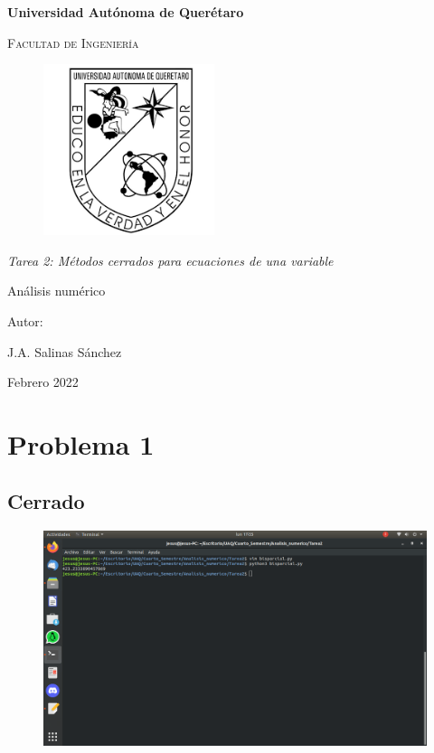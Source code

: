 \documentclass[12pt,oneside,FLEQN]{report}
\begin{document}
{
\selectfont
\begin{titlepage}
        \topmargin=0cm
        \centering

        {\bfseries\LARGE Universidad Autónoma de Querétaro \par}
        \vspace{1cm}
        {\scshape\Large  Facultad de Ingenier\'ia  \par}
        \vspace{2cm}
        \centering
        \begin{figure}[!h]
        \centering
                \includegraphics[height=5cm]{Logouaq.png}
        \end{figure}
        \vspace{3cm}
        {\itshape\large Tarea 2: Métodos cerrados para ecuaciones de una variable\par}
        \vspace{3cm}
        {\Huge Análisis numérico \par}
        \vspace{2cm}
        {\Large Autor: \par}
        {\large J.A. Salinas Sánchez \par}
        {\large Febrero 2022 \par}
\end{titlepage}
\tableofcontents
\section{Problema 1}
	\subsection{Cerrado}
	
	\begin{figure}[!h]
		\centering
		\includegraphics[scale=0.3]{12.png}
	\end{figure}
}
\end{document}
